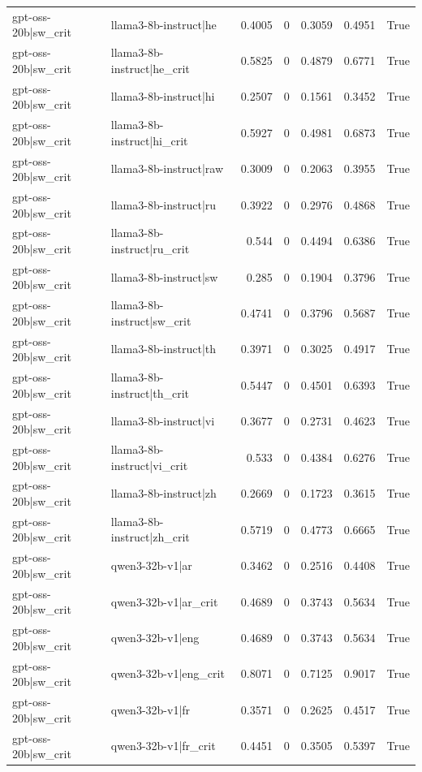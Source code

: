 \begin{table}
\begin{tabular}{l l r r r r l}
gpt-oss-20b|sw_crit & llama3-8b-instruct|he & 0.4005 & 0 & 0.3059 & 0.4951 & True \\
gpt-oss-20b|sw_crit & llama3-8b-instruct|he_crit & 0.5825 & 0 & 0.4879 & 0.6771 & True \\
gpt-oss-20b|sw_crit & llama3-8b-instruct|hi & 0.2507 & 0 & 0.1561 & 0.3452 & True \\
gpt-oss-20b|sw_crit & llama3-8b-instruct|hi_crit & 0.5927 & 0 & 0.4981 & 0.6873 & True \\
gpt-oss-20b|sw_crit & llama3-8b-instruct|raw & 0.3009 & 0 & 0.2063 & 0.3955 & True \\
gpt-oss-20b|sw_crit & llama3-8b-instruct|ru & 0.3922 & 0 & 0.2976 & 0.4868 & True \\
gpt-oss-20b|sw_crit & llama3-8b-instruct|ru_crit & 0.544 & 0 & 0.4494 & 0.6386 & True \\
gpt-oss-20b|sw_crit & llama3-8b-instruct|sw & 0.285 & 0 & 0.1904 & 0.3796 & True \\
gpt-oss-20b|sw_crit & llama3-8b-instruct|sw_crit & 0.4741 & 0 & 0.3796 & 0.5687 & True \\
gpt-oss-20b|sw_crit & llama3-8b-instruct|th & 0.3971 & 0 & 0.3025 & 0.4917 & True \\
gpt-oss-20b|sw_crit & llama3-8b-instruct|th_crit & 0.5447 & 0 & 0.4501 & 0.6393 & True \\
gpt-oss-20b|sw_crit & llama3-8b-instruct|vi & 0.3677 & 0 & 0.2731 & 0.4623 & True \\
gpt-oss-20b|sw_crit & llama3-8b-instruct|vi_crit & 0.533 & 0 & 0.4384 & 0.6276 & True \\
gpt-oss-20b|sw_crit & llama3-8b-instruct|zh & 0.2669 & 0 & 0.1723 & 0.3615 & True \\
gpt-oss-20b|sw_crit & llama3-8b-instruct|zh_crit & 0.5719 & 0 & 0.4773 & 0.6665 & True \\
gpt-oss-20b|sw_crit & qwen3-32b-v1|ar & 0.3462 & 0 & 0.2516 & 0.4408 & True \\
gpt-oss-20b|sw_crit & qwen3-32b-v1|ar_crit & 0.4689 & 0 & 0.3743 & 0.5634 & True \\
gpt-oss-20b|sw_crit & qwen3-32b-v1|eng & 0.4689 & 0 & 0.3743 & 0.5634 & True \\
gpt-oss-20b|sw_crit & qwen3-32b-v1|eng_crit & 0.8071 & 0 & 0.7125 & 0.9017 & True \\
gpt-oss-20b|sw_crit & qwen3-32b-v1|fr & 0.3571 & 0 & 0.2625 & 0.4517 & True \\
gpt-oss-20b|sw_crit & qwen3-32b-v1|fr_crit & 0.4451 & 0 & 0.3505 & 0.5397 & True \\

\end{tabular}
\end{table}
